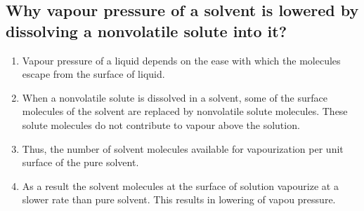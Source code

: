 \documentclass{article}
\begin{document}
   \subsection{Why vapour pressure of a solvent is lowered by
   dissolving a nonvolatile solute into it?}
   \begin{enumerate}
	\item Vapour pressure of a liquid depends on the ease with
	which the molecules escape from the surface of liquid.
	\item When a nonvolatile solute is dissolved in a solvent,
	some of the surface molecules of the solvent are replaced
	by nonvolatile solute molecules. These solute molecules do not
	contribute to vapour above the solution.
	\item Thus, the number of solvent molecules available for
	vapourization per unit surface of the pure solvent.
	\item As a result the solvent molecules at the surface of
	solution vapourize at a slower rate than pure solvent. This
	results in lowering of vapou pressure.
   \end{enumerate}
\end{document}
